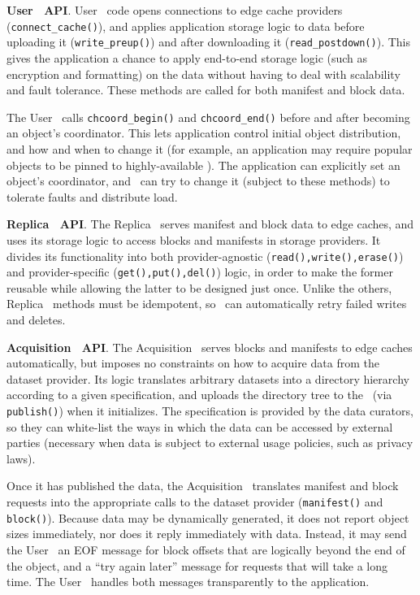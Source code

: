 {\bf User \SG\ API}.  User \SG\ code opens connections to edge cache
providers (\texttt{connect\_cache()}), and applies application storage logic
to data before uploading it (\texttt{write\_preup()}) and after downloading
it (\texttt{read\_postdown()}).  This gives the application a 
chance to apply end-to-end storage logic (such as encryption and formatting) on the data without 
having to deal with scalability and fault tolerance.  These methods are called for 
both manifest and block data.

The User \SG\ calls \texttt{chcoord\_begin()} and \texttt{chcoord\_end()} before 
and after becoming an object's coordinator.
This lets application control initial object distribution, and how and when to change it (for example,
an application may require popular objects to be pinned to highly-available \SGs).
The application can explicitly set an object's coordinator,
and \Syndicate\ can try to change it (subject to these methods) to tolerate faults and distribute load.

{\bf Replica \SG\ API}.  The Replica \SG\ serves manifest and block data to edge caches,
and uses its storage logic to access blocks and 
manifests in storage providers. It divides its functionality into both
provider-agnostic (\texttt{read(),write(),erase()}) and provider-specific (\texttt{get(),put(),del()})
logic, in order to make the former reusable while allowing the latter 
to be designed just once.  Unlike the others, Replica \SG\ methods must be
idempotent, so \Syndicate\ can automatically retry failed writes and deletes.

{\bf Acquisition \SG\ API}.  The Acquisition \SG\ serves blocks 
and manifests to edge caches automatically, but imposes no constraints on
how to acquire data from the dataset provider.  Its
logic translates arbitrary datasets into a directory hierarchy according to
a given specification, and uploads the directory 
tree to the \MS\ (via \texttt{publish()}) when it initializes.
The specification is provided by the data curators,
so they can white-list the ways in which the data can be
accessed by external parties (necessary when data is subject to
external usage policies, such as privacy laws).

Once it has published the data, the Acquisition \SG\ translates
manifest and block requests into the appropriate calls to the dataset provider
(\texttt{manifest()} and \texttt{block()}).
Because data may be dynamically generated, it does not 
report object sizes immediately, nor does it reply immediately with data.
Instead, it may send the User \SG\
an EOF message for block offsets that are logically beyond the end of the object,
and a ``try again later'' message for requests that will take a long time.
The User \SG\ handles both messages transparently to the application.

